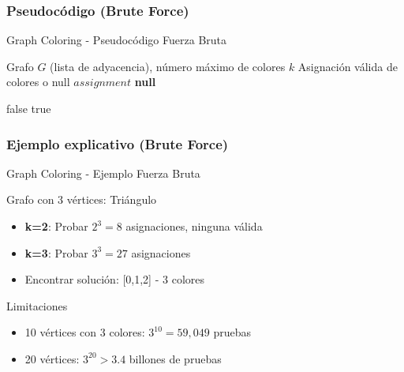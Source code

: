 \documentclass[aspectratio=169]{beamer}
\renewcommand{\algorithmicrequire}{\textbf{Entrada:}}
\renewcommand{\algorithmicensure}{\textbf{Salida:}}
\newcommand{\REQUIRE}{\State[\algorithmicrequire]}
\newcommand{\ENSURE}{\State[\algorithmicensure]}
\begin{document}
\subsubsection{Pseudocódigo (Brute Force)}
\begin{frame}[fragile]{Graph Coloring - Pseudocódigo Fuerza Bruta}
\scriptsize
\begin{algorithmic}[1]
\REQUIRE Grafo $G$ (lista de adyacencia), número máximo de colores $k$
\ENSURE Asignación válida de colores o null
 
     
        \Return $assignment$
    \EndIf
\EndFor
\Return \textbf{null}
\end{algorithmic}

\begin{algorithmic}[1]
 
     
            \Return false 
        \EndIf
    \EndFor
\EndFor
\Return true
\EndFunction
\end{algorithmic}
\normalsize
\end{frame}

\subsubsection{Ejemplo explicativo (Brute Force)}
\begin{frame}{Graph Coloring - Ejemplo Fuerza Bruta}
\begin{exampleblock}{Grafo con 3 vértices: Triángulo}
\begin{itemize}
\item \textbf{k=2}: Probar $2^3=8$ asignaciones, ninguna válida
\item \textbf{k=3}: Probar $3^3=27$ asignaciones
\item Encontrar solución: [0,1,2] - 3 colores
\end{itemize}
\end{exampleblock}

\begin{block}{Limitaciones}
\begin{itemize}
\item 10 vértices con 3 colores: $3^{10} = 59,049$ pruebas
\item 20 vértices: $3^{20} > 3.4$ billones de pruebas
\end{itemize}
\end{block}
\end{frame}
\end{document}
